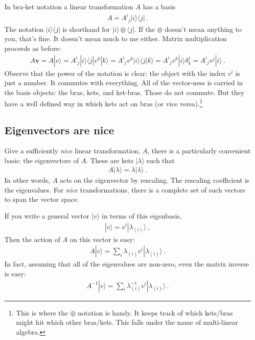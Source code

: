 \documentclass[12pt]{article}
\numberwithin{equation}{section}    %
\renewcommand{\vec}[1]{\mathbf{#1}} %
\begin{document}
In bra-ket notation a linear transformation $A$ has a basis
\begin{align}
  A = A^i_{\phantom{i}j} |i\rangle \langle j| \ .
\end{align}
The notation $|i\rangle \langle j|$ is shorthand for $|i\rangle \otimes \langle j|$. If the $\otimes$ doesn’t mean anything to you, that’s fine. It doesn’t mean much to me either. Matrix multiplication proceeds as before:
\begin{align}
  A\vec{v} = A|v\rangle = 
  A^i_{\phantom{i}j} |i\rangle \langle j| v^k |k \rangle
  = 
  A^i_{\phantom{i}j}  v^k  |i\rangle \langle j|k \rangle
  = 
  A^i_{\phantom{i}j}  v^k  |i\rangle \delta^j_k
  = 
  A^i_{\phantom{i}j}  v^j  |i\rangle \ .
\end{align}
Observe that the power of the notation is clear: the object with the index $v^i$ is just a number. It commutes with everything. All of the vector-ness is carried in the basis objects: the bras, kets, and ket-bras. Those do not commute. But they have a well defined way in which kets act on bras (or vice versa).\footnote{This is where the $\oplus$ notation is handy. It keeps track of which kets/bras might hit which other bras/kets. This falls under the name of multi-linear algebra.}


\subsection{Eigenvectors are nice}

Give a sufficiently \emph{nice} linear transformation, $A$, there is a particularly convenient basis: the eigenvectors of $A$. These are kets $|\lambda\rangle$ such that
\begin{align}
  A |\lambda\rangle = \lambda |\lambda\rangle \ .
\end{align}
In other words, $A$ acts on the eigenvector by rescaling. The rescaling coefficient is the eigenvalues. For \emph{nice} transformations, there is a complete set of such vectors to span the vector space.

If you write a general vector $|v\rangle$ in terms of this eigenbasis,
\begin{align}
  |v\rangle = v^i |\lambda_{(i)} \rangle \ ,
\end{align}
Then the action of $A$ on this vector is easy:
\begin{align}
  A |v\rangle = \sum_i \lambda_{(i)} v^i |\lambda_{(i)} \rangle \ .
\end{align}
In fact, assuming that all of the eigenvalues are non-zero, even the matrix inverse is easy:
\begin{align}
  A^{-1}|v\rangle = \sum_i \lambda_{(i)}^{-1} v^i |\lambda_{(i)} \rangle \ .
\end{align}
\end{document}

